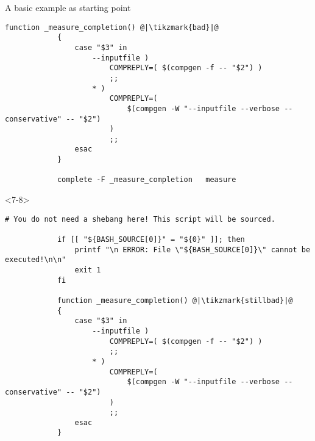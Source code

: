 \begin{frame}[fragile]{A basic example as starting point}
\begin{onlyenv}
\begin{lstlisting}[style=myBash, numbers=none, style=smaller]
            function _measure_completion() @|\tikzmark{bad}|@
            {
                case "$3" in
                    --inputfile )
                        COMPREPLY=( $(compgen -f -- "$2") )
                        ;;
                    * )
                        COMPREPLY=(
                            $(compgen -W "--inputfile --verbose --conservative" -- "$2")
                        )
                        ;;
                esac
            }

            complete -F _measure_completion   measure
        \end{lstlisting}
    \end{onlyenv}
    \begin{onlyenv}<7-8>
            \begin{lstlisting}[style=myBash, numbers=none, style=smaller]
            # You do not need a shebang here! This script will be sourced.

            if [[ "${BASH_SOURCE[0]}" = "${0}" ]]; then
                printf "\n ERROR: File \"${BASH_SOURCE[0]}\" cannot be executed!\n\n"
                exit 1
            fi

            function _measure_completion() @|\tikzmark{stillbad}|@
            {
                case "$3" in
                    --inputfile )
                        COMPREPLY=( $(compgen -f -- "$2") )
                        ;;
                    * )
                        COMPREPLY=(
                            $(compgen -W "--inputfile --verbose --conservative" -- "$2")
                        )
                        ;;
                esac
            }


\end{lstlisting}
\end{onlyenv}
\end{frame}
